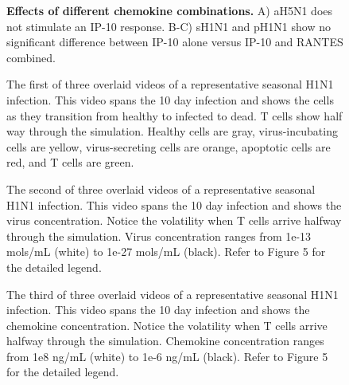 \documentclass[10pt]{article}
\newcommand{\drew}[1]{{\color{dkgreen}#1}}
\begin{document}
\begin{figure}[ht!]
\begin{center}
	\caption{\textbf{Effects of different chemokine combinations.}  A) aH5N1 does not stimulate an IP-10 response.  B-C) sH1N1 and pH1N1 show no significant difference between IP-10 alone versus IP-10 and RANTES combined.}
	\label{fig:chemokine}
\end{center}
\end{figure}


\setcounter{figure}{0}
\renewcommand{\figurename}{Video}


\begin{figure}[ht!]
\caption{The first of three overlaid videos of a representative seasonal H1N1 infection.  This video spans the 10 day infection and shows the cells as they transition from healthy to infected to dead.  T cells show half way through the simulation.  Healthy cells are gray, virus-incubating cells are yellow, virus-secreting cells are orange, apoptotic cells are red, and T cells are green.} 
 \label{video:cell_view}
\end{figure}

\begin{figure}[ht!]
\caption{The second of three overlaid videos of a representative seasonal H1N1 infection.  This video spans the 10 day infection and shows the virus concentration.  Notice the volatility when T cells arrive halfway through the simulation.  Virus concentration ranges from 1e-13 mols/mL (white) to 1e-27 mols/mL (black).  Refer to Figure 5 for the detailed legend. } 
 \label{video:virus_view}
\end{figure}

\begin{figure}[ht!]
\caption{The third of three overlaid videos of a representative seasonal H1N1 infection.  This video spans the 10 day infection and shows the chemokine concentration.  Notice the volatility when T cells arrive halfway through the simulation.  Chemokine concentration ranges from 1e8 ng/mL (white) to 1e-6 ng/mL (black).  Refer to Figure 5 for the detailed legend. } 
 \label{video:chemokine_view}
\end{figure}
\end{document}
